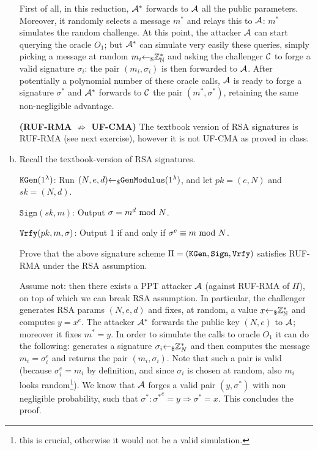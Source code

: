 \begin{enumerate}[(a)]
\begin{solution}
		First of all, in this reduction, $\mathcal{A}^*$ forwards to $\mathcal{A}$ all the public parameters. Moreover, it randomly selects a message $m^*$ and relays this to $\mathcal{A}$: $m^*$ simulates the random challenge. At this point, the attacker $\mathcal{A}$ can start querying the oracle $O_1$; but $\mathcal{A}^*$ can simulate very easily these queries, simply picking a message at random $m_i {\leftarrow_\$} {\mathbb Z}_{\mathbb N}^*$ and asking the challenger $\mathcal{C}$ to forge a valid signature $\sigma_i$: the pair $(m_i, \sigma_i)$ is then forwarded to $\mathcal{A}$. After potentially a polynomial number of these oracle calls, $\mathcal{A}$ is ready to forge a signature $\sigma^*$ and $\mathcal{A}^*$ forwards to $\mathcal{C}$ the pair $(m^*, \sigma^*)$, retaining the same non-negligible advantage.

		\bigskip
		\textbf{(RUF-RMA $\not\Rightarrow$ UF-CMA)}
		The textbook version of RSA signatures is RUF-RMA (see next exercise), however it is not UF-CMA as proved in class.
	\end{solution}
	
	\item Recall the textbook-version of RSA signatures.
	
	$\texttt{KGen}(1^\lambda)$: Run $(N, e, d) {\leftarrow_\$} \texttt{GenModulus}(1^\lambda)$, and let $pk = (e, N)$ and $sk = (N, d)$.

	$\texttt{Sign}(sk, m)$: Output $\sigma = m^d \mbox{ mod }  N$.

	$\texttt{Vrfy}(pk, m, \sigma)$: Output 1 if and only if $\sigma^e \equiv m \mbox{ mod }  N$.

	Prove that the above signature scheme $\Pi = (\texttt{KGen}, \texttt{Sign}, \texttt{Vrfy})$ satisfies RUF-RMA under the RSA assumption.
	
	\begin{solution}
		Assume not: then there exists a PPT attacker $\mathcal{A}$ (against RUF-RMA of $\Pi$), on top of which we can break RSA assumption. In particular, the challenger generates RSA params $(N, e, d)$ and fixes, at random, a value $x {\leftarrow_\$} {\mathbb Z}_{\mathbb N}^*$ and computes $y = x^e$. The attacker $\mathcal{A}^*$ forwards the public key $(N, e)$ to $\mathcal{A}$; moreover it fixes $m^* = y$. In order to simulate the calls to oracle $O_1$ it can do the following: generates a signature $\sigma_i {\leftarrow_\$} {\mathbb Z}_N^*$ and then computes the message $m_i = \sigma_i^e$ and returns the pair $(m_i, \sigma_i)$. Note that such a pair is valid (because $\sigma_i^e = m_i$ by definition, and since $\sigma_i$ is chosen at random, also $m_i$ looks random\footnote{this is crucial, otherwise it would not be a valid simulation.}). We know that $\mathcal{A}$ forges a valid pair $(y, \sigma^*)$ with non negligible probability, such that $\sigma^*: {\sigma^*}^e = y \Rightarrow \sigma^* = x$. This concludes the proof.
	\end{solution}
\end{enumerate}